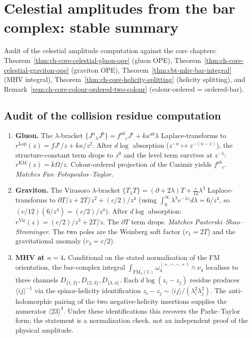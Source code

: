 \documentclass[11pt]{article}
\newcommand{\C}{\mathbb{C}}
\begin{document}

\section{Celestial amplitudes from the bar complex: stable summary}
\label{sec:celestial-bar-stable}

Audit of the celestial amplitude computation against the core
chapters: Theorem~\ref{thm:ch-core-celestial-gluon-ope}
(gluon OPE), Theorem~\ref{thm:ch-core-celestial-graviton-ope} (graviton
OPE), Theorem~\ref{thm:cbt-mhv-bar-integral} (MHV integral),
Theorem~\ref{thm:ch-core-helicity-splitting} (helicity splitting), and
Remark~\ref{rem:ch-core-colour-ordered-two-colour} (colour-ordered =
ordered-bar).

\subsection*{Audit of the collision residue computation}

\begin{enumerate}[label=(\roman*),nosep]
\item \textbf{Gluon.}  The $\lambda$-bracket $\{J^a{}_\lambda J^b\} =
  f^{ab}{}_c J^c + k\kappa^{ab}\lambda$ Laplace-transforms to
  $r^{\mathrm{Lap}}(z) = fJ^c/z + k\kappa/z^2$.  After $d\log$
  absorption ($z^{-n}\mapsto z^{-(n-1)}$), the structure-constant
  term drops to $z^0$ and the level term survives at $z^{-1}$:
  $r^{\mathrm{KM}}(z) = k\Omega/z$.  Colour-ordered projection of the
  Casimir yields $f^{ab}{}_c$.  \emph{Matches Fan--Fotopoulos--Taylor.}

\item \textbf{Graviton.}  The Virasoro $\lambda$-bracket
  $\{T{}_\lambda T\} = (\partial + 2\lambda)T + \frac{c}{12}\lambda^3$
  Laplace-transforms to $\partial T/z + 2T/z^2 + (c/2)/z^4$ (using
  $\int_0^\infty \lambda^3 e^{-\lambda z}d\lambda = 6/z^4$, so
  $(c/12)(6/z^4) = (c/2)/z^4$).  After $d\log$ absorption:
  $r^{\mathrm{Vir}}(z) = (c/2)/z^3 + 2T/z$.  The $\partial T$ term
  drops.  \emph{Matches Pasterski--Shao--Strominger.}  The two poles
  are the Weinberg soft factor ($r_1 = 2T$) and the gravitational
  anomaly ($r_3 = c/2$).

\item \textbf{MHV at $n=4$.}  Conditional on the stated
  normalisation of the FM orientation, the bar-complex integral
  $\int_{\overline{\mathrm{FM}}_4(\C)} \omega_4^{(+,-,-,+)} \wedge \nu_4$
  localises to three channels $D_{\{1,2\}}, D_{\{2,3\}}, D_{\{3,4\}}$.
  Each $d\log(z_i - z_j)$ residue produces $\langle ij\rangle^{-1}$ via
  the spinor-helicity identification $z_i - z_j \sim \langle ij\rangle /
  (\lambda_i^2\lambda_j^2)$.  The anti-holomorphic pairing of the two
  negative-helicity insertions supplies the numerator
  $\langle 23\rangle^4$.  Under these identifications this
  recovers the Parke--Taylor form; the statement is a
  normalization check, not an independent proof of the physical
  amplitude.
\end{enumerate}
\end{document}
